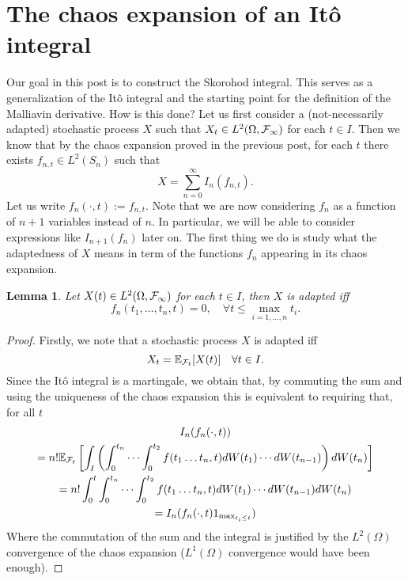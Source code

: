 \documentclass[12pt]{article}
\newtheorem{lemma}{Lemma}
\begin{document}
\section{The chaos expansion of an Itô integral}
Our goal in this post is to construct the Skorohod integral. This serves as a generalization of the Itô integral and the starting point for the definition of the Malliavin derivative. How is this done? Let us first consider a (not-necessarily adapted) stochastic process $X$ such that $X_t\in L^2(\Omega,\mathcal{F}_\infty)$ for each $t \in I$. Then we know that by the chaos expansion proved in the previous post, for each $t$ there exists  $f_{n,t}\in L^2(S_n)$ such that
\begin{equation*}
    X=\sum_{n=0}^{\infty} I_n(f_{n,t}).
\end{equation*}
Let us write $f_{n}(\cdot,t):=f_{n,t}$. Note that we are now considering $f_n$ as a function of $n+1$ variables instead of  $n$. In particular, we will be able to consider expressions like  $I_{n+1}(f_n)$ later on. The first thing we do is study what the adaptedness of $X$ means in term of the functions $f_n$ appearing in its chaos expansion.
\begin{lemma}
    Let $X(t) \in L^2(\Omega,\mathcal{F}_\infty)$ for each $t \in  I$, then $X$ is adapted iff
    \begin{equation*}
    	f_n(t_1,\ldots,t_n,t)=0,\quad\forall t\leq\max_{i=1,\ldots,n} t_i .
    \end{equation*}
\end{lemma}
\begin{proof}
    Firstly, we note that a stochastic process $X$ is adapted iff $$X_t=\mathbb{E}_{\mathcal{F}_t}[X(t)]\quad\forall t\in I.$$ Since the Itô integral is a martingale, we obtain that, by commuting the sum and using the uniqueness of the chaos expansion this is equivalent to requiring that, for all $t$
    \begin{multline*}
    	I_n(f_n(\cdot,t))\\=	n!\mathbb{E}_{\mathcal{F}_t} \left[\int_{I} \left( \int_{0}^{t_n}\cdots \int_{0}^{t_2}f(t_1\ldots t_n,t) dW(t_1) \cdots dW(t_{n-1}) \right)dW(t_n)\right]\\
    	=n!\int_{0}^t \int_{0}^{t_n}\cdots \int_{0}^{t_2}f(t_1\ldots t_n,t) dW(t_1) \cdots dW(t_{n-1})dW(t_n)\\= I_n(f_n(\cdot,t) 1_{\max_{t_i\leq t}})
    \end{multline*}
    Where the commutation of the sum and the integral is justified by the $L^2(\Omega)$ convergence of the chaos expansion ($L^1(\Omega)$ convergence would have been enough).
\end{proof}
\end{document}
